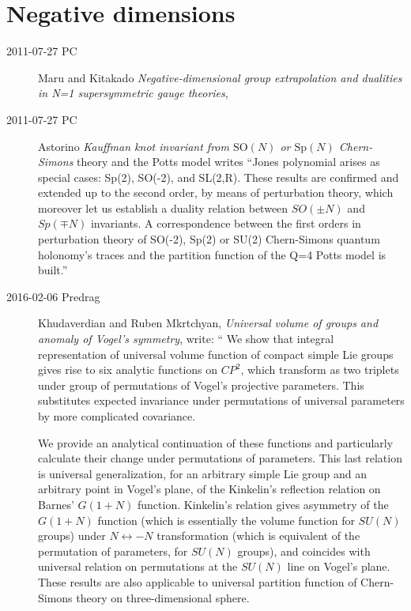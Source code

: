 

\chapter{Negative dimensions}
\label{c-negative}

\begin{description}

\item[2011-07-27 PC]
Maru and Kitakado {\em Negative-dimensional group
extrapolation and dualities in {N=1} supersymmetric gauge theories},

\item[2011-07-27 PC]
Astorino {\em Kauffman knot invariant from $\mathrm{SO}(N)$
or $\mathrm{Sp}(N)$ Chern-Simons} theory and the {Potts} model writes
``Jones polynomial arises as special cases: Sp(2), SO(-2), and SL(2,R).
These results are confirmed and extended up to the second order, by means
of perturbation theory, which moreover let us establish a duality
relation between $SO(\pm N)$ and $Sp(\mp N)$ invariants. A correspondence
between the first orders in perturbation theory of SO(-2), Sp(2) or SU(2)
Chern-Simons quantum holonomy's traces and the partition function of the
Q=4 Potts model is built.''

\item[2016-02-06  Predrag] Khudaverdian and Ruben Mkrtchyan,
{\em Universal volume of groups and anomaly of {Vogel}'s symmetry},
write: ``
We show that integral representation of universal
volume function of compact simple Lie groups gives rise to six analytic
functions on $CP^2$, which transform as two triplets under group of
permutations of Vogel's projective parameters.  This substitutes
expected invariance under permutations of universal parameters by more
complicated covariance.

 We provide an analytical continuation of these functions and particularly
calculate their change  under  permutations of parameters.  This last
relation is universal generalization, for an arbitrary simple Lie group
and an arbitrary point in Vogel's plane, of the Kinkelin's reflection
relation on Barnes' $G(1+N)$ function. Kinkelin's relation gives asymmetry
of the $G(1+N)$ function (which is essentially the volume function for $SU(N)$
groups)  under $N\leftrightarrow -N$ transformation (which is  equivalent
of the permutation of parameters, for $SU(N)$ groups), and coincides with
universal relation on permutations at the $SU(N)$ line on Vogel's plane.
These results are also applicable to universal partition function of
Chern-Simons theory on three-dimensional sphere.


\end{description}
